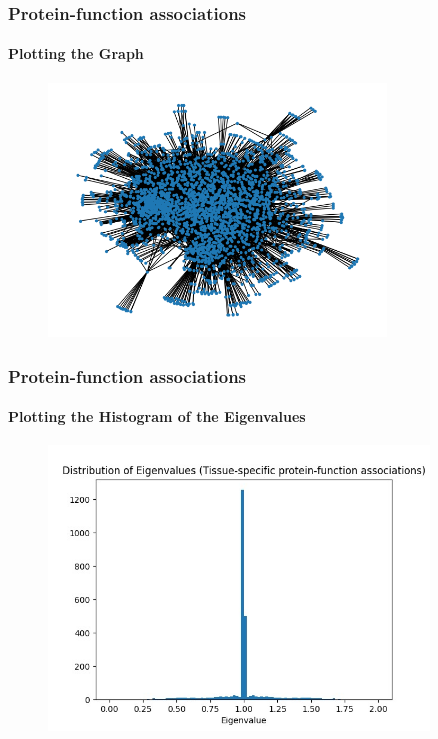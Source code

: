 \documentclass[aspectratio=43,leqno]{beamer}
\begin{document}
\begin{frame}
  \frametitle{Protein-function associations}
  \framesubtitle{Plotting the Graph}

 \begin{figure}[h]
    \centering
    \includegraphics[width=0.8\textwidth]{images/tfg-graph.png}
    \label{fig:mesh1}
  \end{figure}
  
\end{frame}

\begin{frame}
  \frametitle{Protein-function associations}
  \framesubtitle{Plotting the Histogram of the Eigenvalues}

 \begin{figure}[h]
    \centering
    \includegraphics[width=0.9\textwidth]{images/tfg-hist.jpeg}
    \label{fig:mesh1}
  \end{figure}
  
\end{frame}
\end{document}
